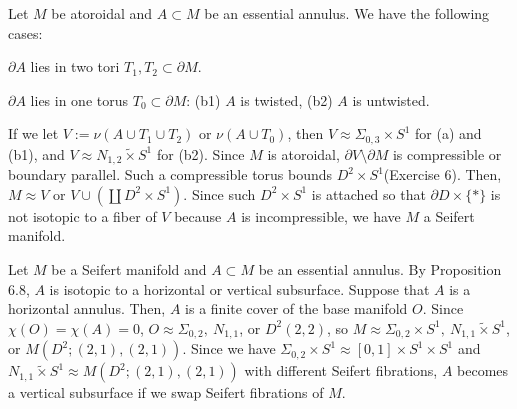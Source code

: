\documentclass{../../../small}
\begin{document}
\begin{pf}
Let $M$ be atoroidal and $A\subset M$ be an essential annulus.
We have the following cases:
\begin{parts}
\item $\partial A$ lies in two tori $T_1,T_2\subset\partial M$.
\item $\partial A$ lies in one torus $T_0\subset\partial M$:
(b1) $A$ is twisted, (b2) $A$ is untwisted.
\end{parts}
If we let $V:=\nu(A\cup T_1\cup T_2)$ or $\nu(A\cup T_0)$, then $V\approx\Sigma_{0,3}\times S^1$ for (a) and (b1), and $V\approx N_{1,2}\tilde\times S^1$ for (b2).
Since $M$ is atoroidal, $\partial V\setminus\partial M$ is compressible or boundary parallel.
Such a compressible torus bounds $D^2\times S^1$(Exercise 6).
Then, $M\approx V$ or $V\cup(\coprod D^2\times S^1)$.
Since such $D^2\times S^1$ is attached so that $\partial D\times\{*\}$ is not isotopic to a fiber of $V$ because $A$ is incompressible, we have $M$ a Seifert manifold.
\end{pf}

\begin{pf}
Let $M$ be a Seifert manifold and $A\subset M$ be an essential annulus.
By Proposition 6.8, $A$ is isotopic to a horizontal or vertical subsurface.
Suppose that $A$ is a horizontal annulus.
Then, $A$ is a finite cover of the base manifold $O$.
Since $\chi(O)=\chi(A)=0$, $O\approx\Sigma_{0,2},\ N_{1,1}$, or $D^2(2,2)$, so $M\approx\Sigma_{0,2}\times S^1,\ N_{1,1}\tilde\times S^1$, or $M(D^2;(2,1),(2,1))$.
Since we have $\Sigma_{0,2}\times S^1\approx[0,1]\times S^1\times S^1$ and $N_{1,1}\tilde\times S^1\approx M(D^2;(2,1),(2,1))$ with different Seifert fibrations, $A$ becomes a vertical subsurface if we swap Seifert fibrations of $M$.
\end{pf}
\end{document}
